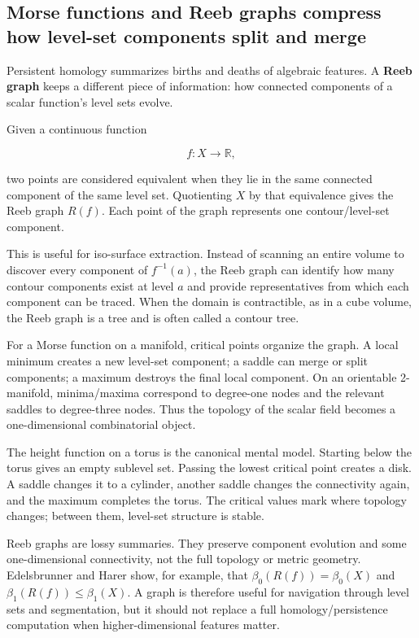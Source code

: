 \subsection{Morse functions and Reeb graphs compress how level-set components split and merge}\label{03-visual-computing-i-ch002-morse-functions-and-reeb-graphs-compress-how-level-set-components-split-and-merge}

Persistent homology summarizes births and deaths of algebraic features. A \textbf{Reeb graph} keeps a different piece of information: how connected components of a scalar function's level sets evolve.

Given a continuous function

\[
f:X\rightarrow\mathbb R,
\]

two points are considered equivalent when they lie in the same connected component of the same level set. Quotienting \(X\) by that equivalence gives the Reeb graph \(R(f)\). Each point of the graph represents one contour/level-set component.

This is useful for iso-surface extraction. Instead of scanning an entire volume to discover every component of \(f^{-1}(a)\), the Reeb graph can identify how many contour components exist at level \(a\) and provide representatives from which each component can be traced. When the domain is contractible, as in a cube volume, the Reeb graph is a tree and is often called a contour tree.

For a Morse function on a manifold, critical points organize the graph. A local minimum creates a new level-set component; a saddle can merge or split components; a maximum destroys the final local component. On an orientable 2-manifold, minima/maxima correspond to degree-one nodes and the relevant saddles to degree-three nodes. Thus the topology of the scalar field becomes a one-dimensional combinatorial object.

The height function on a torus is the canonical mental model. Starting below the torus gives an empty sublevel set. Passing the lowest critical point creates a disk. A saddle changes it to a cylinder, another saddle changes the connectivity again, and the maximum completes the torus. The critical values mark where topology changes; between them, level-set structure is stable.

Reeb graphs are lossy summaries. They preserve component evolution and some one-dimensional connectivity, not the full topology or metric geometry. Edelsbrunner and Harer show, for example, that \(\beta_0(R(f))=\beta_0(X)\) and \(\beta_1(R(f))\le\beta_1(X)\). A graph is therefore useful for navigation through level sets and segmentation, but it should not replace a full homology/persistence computation when higher-dimensional features matter.

